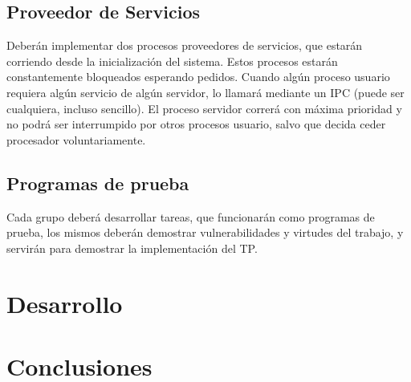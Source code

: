 \documentclass[a4paper,10pt]{article}
\begin{document}
\subsection{Proveedor de Servicios}
Deberán implementar dos procesos proveedores de servicios, que estarán corriendo 
desde la inicialización del sistema. Estos procesos estarán constantemente
bloqueados esperando pedidos. Cuando algún proceso usuario requiera algún
servicio de algún servidor, lo llamará mediante un IPC (puede ser cualquiera,
incluso sencillo). El proceso servidor correrá con máxima prioridad y no podrá
ser interrumpido por otros procesos usuario, salvo que decida ceder procesador
voluntariamente.

\subsection{Programas de prueba}
Cada grupo deberá desarrollar tareas, que funcionarán como programas de
prueba, los mismos deberán demostrar vulnerabilidades y virtudes del trabajo,
y servirán para demostrar la implementación del TP.


\newpage


\section{Desarrollo}


\newpage
\section{Conclusiones}

\bigskip
\end{document}
